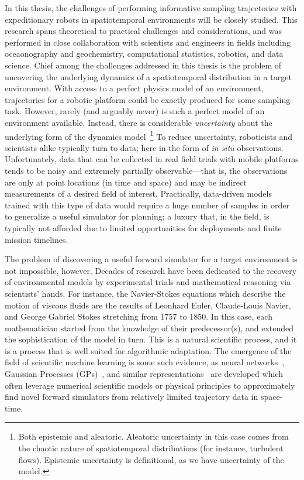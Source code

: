 In this thesis, the challenges of performing informative sampling trajectories with expeditionary robots in spatiotemporal environments will be closely studied. 
This research spans theoretical to practical challenges and considerations, and was performed in close collaboration with scientists and engineers in fields including oceaonography and geochemistry, computational statistics, robotics, and data science.
Chief among the challenges addressed in this thesis is the problem of uncovering the underlying dynamics of a spatiotemporal distribution in a target environment.
With access to a perfect physics model of an environment, trajectories for a robotic platform could be exactly produced for some sampling task.
However, rarely (and arguably never) is such a perfect model of an environment available.
Instead, there is considerable \emph{uncertainty} about the underlying form of the dynamics model~\footnote{Both epistemic and aleatoric. Aleatoric uncertainty in this case comes from the chaotic nature of spatiotemporal distributions (for instance, turbulent flows). Epistemic uncertainty is definitional, as we have uncertainty of the model.}
To reduce uncertainty, roboticists and scientists alike typically turn to data; here in the form of \emph{in situ} observations.
Unfortunately, data that can be collected in real field trials with mobile platforms tends to be noisy and extremely partially observable---that is, the observations are only at point locations (in time and space) and may be indirect measurements of a desired field of interest. 
Practically, data-driven models trained with this type of data would require a huge number of samples in order to generalize a useful simulator for planning; a luxury that, in the field, is typically not afforded due to limited opportunities for deployments and finite mission timelines.

The problem of discovering a useful forward simulator for a target environment is not impossible, however.
Decades of research have been dedicated to the recovery of environmental models by experimental trials and mathematical reasoning via scientists' hands.
For instance, the Navier-Stokes equations which describe the motion of viscous fluids are the results of Leonhard Euler, Claude-Louis Navier, and George Gabriel Stokes stretching from 1757 to 1850. 
In this case, each mathematician started from the knowledge of their predecessor(s), and extended the sophistication of the model in turn.
This is a natural scientific process, and it is a process that is well suited for algorithmic adaptation.
The emergence of the field of scientific machine learning is some such evidence, as neural networks~\autocite{raissi2019physics, sapsis2009dynamically, mohan2019compressed}, Gaussian Processes (GPs)~\autocite{raissi2018numerical}, and similar representations~\autocite{kulkarni2019advection, brunton2016discovering} are developed which often leverage numerical scientific models or physical principles to approximately find novel forward simulators from relatively limited trajectory data in space-time.


